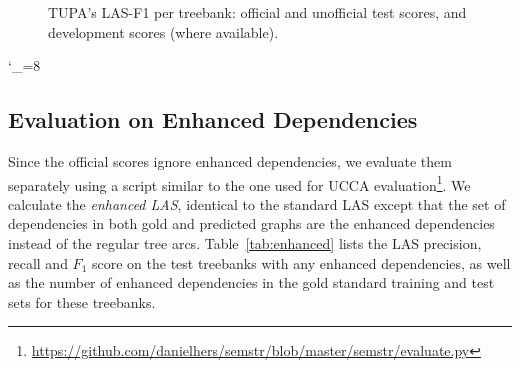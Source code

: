 \documentclass[11pt,a4paper]{article}
\begin{document}
\begin{figure*}[h]
    \caption{TUPA's LAS-F1 per treebank: official and unofficial test scores, and development scores (where available).
    \label{fig:test_per_corpus}}
\end{figure*}
\catcode`\_=8


\subsection{Evaluation on Enhanced Dependencies}\label{sec:enhanced_results}

Since the official scores ignore enhanced dependencies,
we evaluate them separately using a script similar to the one used for UCCA
evaluation\footnote{\url{https://github.com/danielhers/semstr/blob/master/semstr/evaluate.py}}.
We calculate the \textit{enhanced LAS},
identical to the standard LAS except that the set of dependencies
in both gold and predicted graphs are the enhanced dependencies instead
of the regular tree arcs.
Table~\ref{tab:enhanced} lists the LAS precision, recall and $F_1$ score
on the test treebanks with any enhanced dependencies,
as well as the number of enhanced dependencies in the gold standard
training and test sets for these treebanks.
\end{document}
